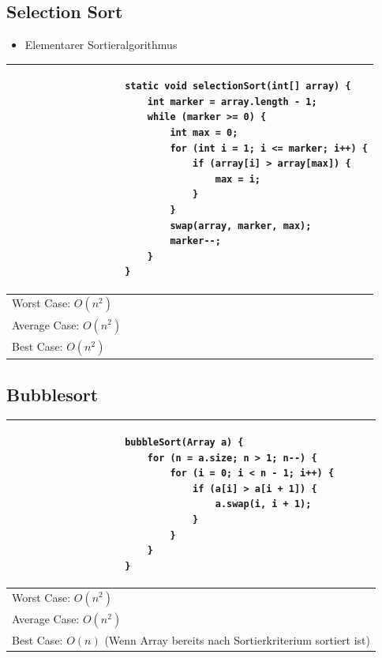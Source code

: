 \documentclass[a4paper, landscape, 8pt]{scrartcl}
\begin{document}
\begin{multicols*}{4}
            \subsection{Selection Sort}
                \begin{itemize}
                    \item Elementarer Sortieralgorithmus
                \end{itemize}
                \begin{tabular}{|p{6.55cm}|}
                    \hline
                    \begin{lstlisting}
                    static void selectionSort(int[] array) {
                        int marker = array.length - 1;
                        while (marker >= 0) {
                            int max = 0;
                            for (int i = 1; i <= marker; i++) {
                                if (array[i] > array[max]) {
                                    max = i;
                                }
                            }
                            swap(array, marker, max);
                            marker--;
                        }
                    }
                    \end{lstlisting} \\
                    \hline
                    Worst Case: $O(n^2)$ \\
                    Average Case: $O(n^2)$ \\
                    Best Case: $O(n^2)$ \\
                    \hline
                \end{tabular}

            \subsection{Bubblesort}
                \begin{tabular}{|p{6.55cm}|}
                    \hline
                    \begin{lstlisting}
                    bubbleSort(Array a) {
                        for (n = a.size; n > 1; n--) {
                            for (i = 0; i < n - 1; i++) {
                                if (a[i] > a[i + 1]) {
                                    a.swap(i, i + 1);
                                }
                            }
                        }
                    }
                    \end{lstlisting} \\
                    \hline
                    Worst Case: $O(n^2)$ \\
                    Average Case: $O(n^2)$ \\
                    Best Case: $O(n)$ (Wenn Array bereits nach Sortierkriterium sortiert ist)\\
                    \hline
                \end{tabular}



\end{multicols*}
\end{document}
